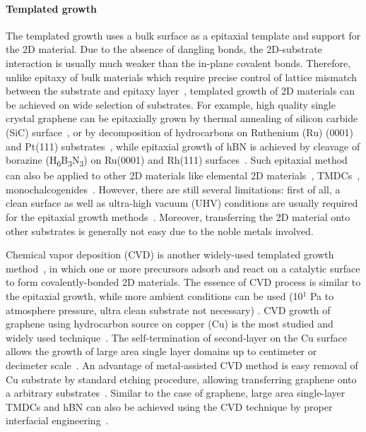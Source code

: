 \paragraph{Templated growth}
The templated growth uses a bulk surface as a epitaxial template and
support for the 2D material. Due to the absence of dangling bonds, the
2D-substrate interaction is usually much weaker than the in-plane
covalent bonds. Therefore, unlike epitaxy of bulk materials which
require precise control of lattice mismatch between the substrate and
epitaxy
layer~\autocite{Koma_1985_vdWE,Ueno_1990_vdWE,Parkinson_1991_vdWE},
templated growth of 2D materials can be achieved on wide selection of
substrates. For example, high quality single crystal graphene can be
epitaxially grown by thermal annealing of silicon carbide (SiC)
surface~\autocite{Berger_2004_sic,de_Heer_2007_epi_gr}, or by decomposition of
hydrocarbons on Ruthenium (Ru) (0001) and Pt(111)
substrates~\autocite{Sutter_2008_gr_Ru,Sutter_2009_Gr_Pt}, while epitaxial
growth of hBN is achieved by cleavage of borazine
(H\textsubscript{6}B\textsubscript{3}N\textsubscript{3}) on Ru(0001)
and Rh(111)
surfaces~\autocite{Goriachko_2007_assembl_hBN_ru,Goriachko_2008_AuNP_moire_hBN}.
%
Such epitaxial method can also be applied to other 2D materials like
elemental 2D
materials~\autocite{Aufray_2010_silicene,Liu_2017_assemb_borophene},
TMDCs~\autocite{Ugeda_2015_deposition},
monochalcogenides~\autocite{Yang_2017_InSe}.
%
However, there are still several limitations: first of all, a clean
surface as well as ultra-high vacuum (UHV) conditions are usually
required for the epitaxial growth
methods~\autocite{Liu_2018_rev}.
%
Moreover, transferring the 2D material
onto other substrates is generally not easy due to the noble metals
involved.
%

Chemical vapor deposition (CVD) is another widely-used templated
growth
method~\autocite{Li_2016_cvd_rev,Novoselov_2016_vdW,Lin_2019_gr_rev_growth},
in which one or more precursors adsorb and react on a catalytic
surface to form covalently-bonded 2D materials.
%
The essence of CVD process is similar to the epitaxial growth, while
more ambient conditions can be used (10$^{1}$ Pa to atmosphere pressure,
ultra clean substrate not necessary) \autocite{Li_2016_cvd_rev}.
%
CVD growth of graphene using hydrocarbon source on copper (Cu) is the
most studied and widely used technique~\autocite{Li_2016_cvd_rev}.
%
The self-termination of second-layer on the Cu surface allows the
growth of large area single layer domains up to centimeter or
decimeter
scale~\autocite{Li_2011_single_crystal,Bae_2010_gr_roll,Xu_2017_gr_single_large}.
An advantage of metal-assisted CVD method is easy removal of Cu
substrate by standard etching procedure, allowing transferring
graphene onto a arbitrary substrates~\autocite{Kim_2009_gr_transparent}.
%
Similar to the case of graphene, large area single-layer TMDCs and hBN
can also be achieved using the CVD technique by proper interfacial
engineering~\autocite{Shi_2012_vdw_epi_MoS2_gr,Lee_2018_gold_BN}.
%

